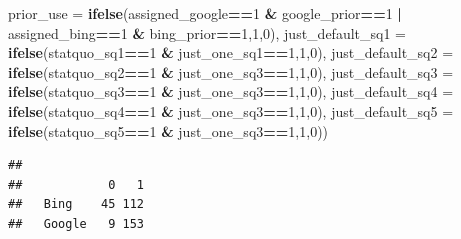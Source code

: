 \documentclass[
  11pt,
]{article}
\newenvironment{Shaded}{\begin{snugshade}}{\end{snugshade}}
\newcommand{\AttributeTok}[1]{\textcolor[rgb]{0.13,0.29,0.53}{#1}}
\newcommand{\DecValTok}[1]{\textcolor[rgb]{0.00,0.00,0.81}{#1}}
\newcommand{\FunctionTok}[1]{\textcolor[rgb]{0.13,0.29,0.53}{\textbf{#1}}}
\newcommand{\NormalTok}[1]{#1}
\newcommand{\SpecialCharTok}[1]{\textcolor[rgb]{0.81,0.36,0.00}{\textbf{#1}}}
\begin{document}
\begin{Shaded}
\begin{Highlighting}[]
         \AttributeTok{prior\_use =} \FunctionTok{ifelse}\NormalTok{(assigned\_google}\SpecialCharTok{==}\DecValTok{1} \SpecialCharTok{\&}\NormalTok{ google\_prior}\SpecialCharTok{==}\DecValTok{1} \SpecialCharTok{|}\NormalTok{ assigned\_bing}\SpecialCharTok{==}\DecValTok{1} \SpecialCharTok{\&}\NormalTok{ bing\_prior}\SpecialCharTok{==}\DecValTok{1}\NormalTok{,}\DecValTok{1}\NormalTok{,}\DecValTok{0}\NormalTok{),}
         \AttributeTok{just\_default\_sq1 =} \FunctionTok{ifelse}\NormalTok{(statquo\_sq1}\SpecialCharTok{==}\DecValTok{1} \SpecialCharTok{\&}\NormalTok{ just\_one\_sq1}\SpecialCharTok{==}\DecValTok{1}\NormalTok{,}\DecValTok{1}\NormalTok{,}\DecValTok{0}\NormalTok{),}
         \AttributeTok{just\_default\_sq2 =} \FunctionTok{ifelse}\NormalTok{(statquo\_sq2}\SpecialCharTok{==}\DecValTok{1} \SpecialCharTok{\&}\NormalTok{ just\_one\_sq3}\SpecialCharTok{==}\DecValTok{1}\NormalTok{,}\DecValTok{1}\NormalTok{,}\DecValTok{0}\NormalTok{),}
         \AttributeTok{just\_default\_sq3 =} \FunctionTok{ifelse}\NormalTok{(statquo\_sq3}\SpecialCharTok{==}\DecValTok{1} \SpecialCharTok{\&}\NormalTok{ just\_one\_sq3}\SpecialCharTok{==}\DecValTok{1}\NormalTok{,}\DecValTok{1}\NormalTok{,}\DecValTok{0}\NormalTok{),}
         \AttributeTok{just\_default\_sq4 =} \FunctionTok{ifelse}\NormalTok{(statquo\_sq4}\SpecialCharTok{==}\DecValTok{1} \SpecialCharTok{\&}\NormalTok{ just\_one\_sq3}\SpecialCharTok{==}\DecValTok{1}\NormalTok{,}\DecValTok{1}\NormalTok{,}\DecValTok{0}\NormalTok{),}
         \AttributeTok{just\_default\_sq5 =} \FunctionTok{ifelse}\NormalTok{(statquo\_sq5}\SpecialCharTok{==}\DecValTok{1} \SpecialCharTok{\&}\NormalTok{ just\_one\_sq3}\SpecialCharTok{==}\DecValTok{1}\NormalTok{,}\DecValTok{1}\NormalTok{,}\DecValTok{0}\NormalTok{))}
\end{Highlighting}
\end{Shaded}

\begin{Shaded}
\end{Shaded}

\begin{verbatim}
##         
##            0   1
##   Bing    45 112
##   Google   9 153
\end{verbatim}

\begin{Shaded}
\end{Shaded}
\end{document}
